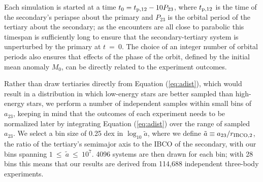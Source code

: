 \documentclass[a4paper,twocolumn]{emulateapj}
\begin{document}
{Each simulation is started at a time $t_{0} = t_{\rm p,12} - 10 P_{23}$, where $t_{\rm p,12}$ is the time of the secondary's periapse about the primary and $P_{23}$ is the orbital period of the tertiary about the secondary; as the encounters are all close to parabolic this timespan is sufficiently long to ensure that the secondary-tertiary system is unperturbed by the primary at $t~=~0$. The choice of an integer number of orbital periods also ensures that effects of the phase of the orbit, defined by the initial mean anomaly $M_{0}$, can be directly related to the experiment outcomes.

Rather than draw tertiaries directly from Equation (\ref{eq:adist}), which would result in a distribution in which low-energy stars are better sampled than high-energy stars, we perform a number of independent samples within small bins of $a_{23}$, keeping in mind that the outcomes of each experiment needs to be normalized later by integrating Equation (\ref{eq:adist}) over the range of sampled $a_{23}$. We select a bin size of 0.25 dex in $\log_{10} \tilde{a}$, where we define $\tilde{a} \equiv a_{23} / r_{\rm IBCO,2}$, the ratio of the tertiary's semimajor axis to the IBCO of the secondary, with our bins spanning $1~\leq~\tilde{a}~\leq~10^{7}$. 4096 systems are then drawn for each bin; with 28 bins this means that our results are derived from 114,688 independent three-body experiments.

}
\end{document}

